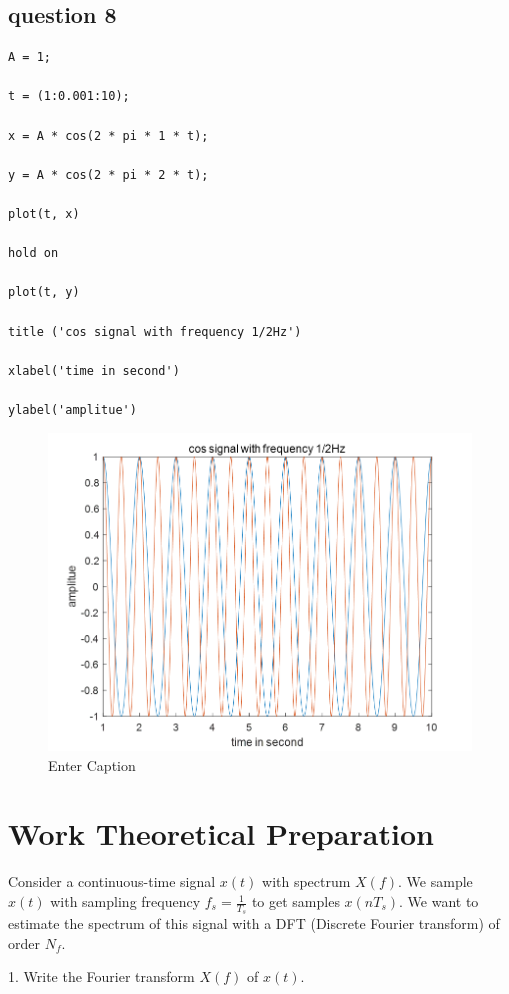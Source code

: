 \documentclass{article}
\begin{document}
\subsection{question 8}
\begin{lstlisting}
A = 1;

t = (1:0.001:10);

x = A * cos(2 * pi * 1 * t);

y = A * cos(2 * pi * 2 * t);

plot(t, x)

hold on

plot(t, y)

title ('cos signal with frequency 1/2Hz')

xlabel('time in second')

ylabel('amplitue')

\end{lstlisting}
\begin{figure}[H]
    \centering
    \includegraphics[width=1\linewidth]{8.png}
    \caption{Enter Caption}
    \label{fig:8}
\end{figure}

\section{Work Theoretical Preparation}
Consider a continuous-time signal $x(t)$ with spectrum $X(f)$. We sample $x(t)$ with sampling frequency $f_s = \frac{1}{T_s}$ to get samples $x(nT_s)$. We want to estimate the spectrum of this signal with a DFT (Discrete Fourier transform) of order $N_f$.

1. Write the Fourier transform $X(f)$ of $x(t)$.
\end{document}

